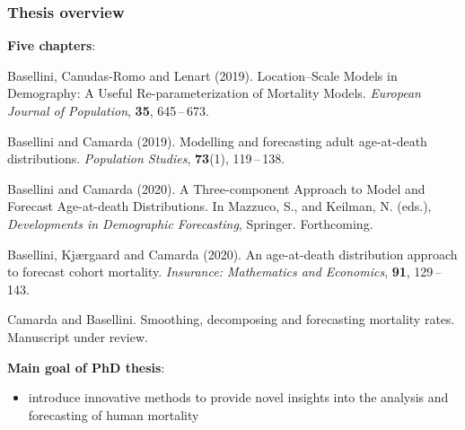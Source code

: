 \documentclass[12pt, xcolor=table]{beamer}  %
\begin{document}
\begin{frame}[plain]\frametitle{Thesis overview}
	\textbf{Five chapters}: 
	\begin{itemize}
		\scriptsize	
		\item Basellini, Canudas-Romo and Lenart (2019). Location--Scale Models in Demography: A Useful Re-parameterization of Mortality Models. {\it European Journal of Population}, {\bf 35}, 645\,--\,673.
		
		\item { Basellini and Camarda (2019). Modelling and forecasting adult age-at-death distributions. {\it Population Studies}, {\bf 73}(1), 119\,--\,138.
		
		\item Basellini and Camarda (2020). A Three-component Approach to Model and Forecast Age-at-death Distributions. In Mazzuco, S., and Keilman, N. (eds.), {\it Developments in Demographic Forecasting}, Springer. Forthcoming.
		
		\item Basellini, Kj{\ae}rgaard and Camarda (2020). An age-at-death distribution approach \\ to forecast cohort mortality. {\it Insurance: Mathematics and Economics}, {\bf 91}, 129\,--\,143.	
		
		\item Camarda and Basellini. Smoothing, decomposing and forecasting mortality rates. Manuscript under review. }	
	\end{itemize}
	\bigskip
	{\pgfsetfillopacity{1} 
	\textbf{Main goal of PhD thesis}: 
	\begin{itemize}
		\item introduce innovative methods to provide novel insights into the analysis and forecasting of human mortality	
	\end{itemize}
}
\end{frame}
\end{document}
